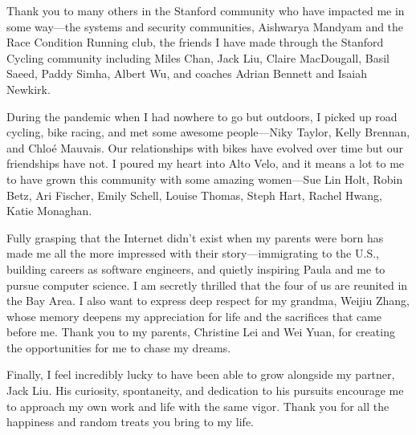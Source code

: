 Thank you to many others in the Stanford community who have impacted me in some
way---the systems and security communities, Aishwarya Mandyam and the Race
Condition Running club, the friends I have made through the Stanford Cycling
community including Miles Chan, Jack Liu, Claire MacDougall, Basil Saeed, Paddy
Simha, Albert Wu, and coaches Adrian Bennett and Isaiah Newkirk.

During the pandemic when I had nowhere to go but outdoors, I picked up road
cycling, bike racing, and met some awesome people---Niky Taylor, Kelly
Brennan, and Chloé Mauvais. Our relationships with bikes have evolved over time
but our friendships have not. I poured my heart into Alto Velo, and it means a
lot to me to have grown this community with some amazing women---Sue Lin Holt,
Robin Betz, Ari Fischer, Emily Schell, Louise Thomas, Steph Hart, Rachel Hwang,
Katie Monaghan.

Fully grasping that the Internet didn't exist when my parents were born has made
me all the more impressed with their story---immigrating to the U.S., building
careers as software engineers, and quietly inspiring Paula and me to pursue
computer science. I am secretly thrilled that the four of us are reunited in
the Bay Area. I also want to express deep respect for my grandma, Weijiu Zhang,
whose memory deepens my appreciation for life and the sacrifices that came
before me. Thank you to my parents, Christine Lei and Wei Yuan, for creating
the opportunities for me to chase my dreams.

Finally, I feel incredibly lucky to have been able to grow alongside my partner,
Jack Liu. His curiosity, spontaneity, and dedication to his pursuits encourage
me to approach my own work and life with the same vigor. Thank you for all the
happiness and random treats you bring to my life.
